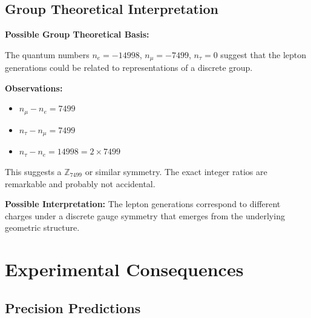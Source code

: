 	\subsection{Group Theoretical Interpretation}
	
	\begin{treatise}
		\textbf{Possible Group Theoretical Basis:}
		
		The quantum numbers $n_e = -14998$, $n_\mu = -7499$, $n_\tau = 0$ suggest that the lepton generations could be related to representations of a discrete group.
		
		\textbf{Observations:}
		\begin{itemize}
			\item $n_\mu - n_e = 7499$
			\item $n_\tau - n_\mu = 7499$
			\item $n_\tau - n_e = 14998 = 2 \times 7499$
		\end{itemize}
		
		This suggests a $\mathbb{Z}_{7499}$ or similar symmetry. The exact integer ratios are remarkable and probably not accidental.
		
		\textbf{Possible Interpretation:}
		The lepton generations correspond to different charges under a discrete gauge symmetry that emerges from the underlying geometric structure.
	\end{treatise}

	\section{Experimental Consequences}
	
	\subsection{Precision Predictions}
	
